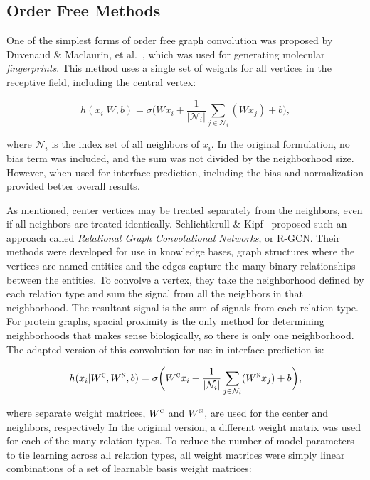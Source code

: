 \subsection{Order Free Methods}
One of the simplest forms of order free graph convolution was proposed by Duvenaud \& Maclaurin, et al.~\cite{duvenaud2015}, which was used for generating molecular \emph{fingerprints}.
This method uses a single set of weights for all vertices in the receptive field, including the central vertex:

\begin{equation}
h(x_i | W, b)= \sigma \bigg( W x_i +  \frac{1}{|\mathcal{N}_i|} \sum_{j \in \mathcal{N}_i} (W x_j) + b\bigg),
\label{eq:fingerprint}
\end{equation}

\noindent
where $\mathcal{N}_i$ is the index set of all neighbors of $x_i$.
In the original formulation, no bias term was included, and the sum was not divided by the neighborhood size.
However, when used for interface prediction, including the bias and normalization provided better overall results.

As mentioned, center vertices may be treated separately from the neighbors, even if all neighbors are treated identically. 
Schlichtkrull \& Kipf~\cite{schlichtkrull2017} proposed such an approach called \emph{Relational Graph Convolutional Networks}, or R-GCN.
Their methods were developed for use in knowledge bases, graph structures where the vertices are named entities and the edges capture the many binary relationships between the entities. 
To convolve a vertex, they take the neighborhood defined by each relation type and sum the signal from all the neighbors in that neighborhood.
The resultant signal is the sum of signals from each relation type.
For protein graphs, spacial proximity is the only method for determining neighborhoods that makes sense biologically, so there is only one neighborhood.
The adapted version of this convolution for use in interface prediction is:

\begin{equation}
h(x_i | W^\textsc{c}, W^\textsc{n}, b)= \sigma \bigg( W^\textsc{c} x_i + \frac{1}{|\mathcal{N}_i|} \sum_{j \in \mathcal{N}_i}(W^\textsc{n} x_j)  + b\bigg),
\label{eq:rgcn}
\end{equation}

\noindent
where separate weight matrices, $W^\textsc{c}$ and $W^\textsc{n}$, are used for the center and neighbors, respectively
In the original version, a different weight matrix was used for each of the many relation types.  
To reduce the number of model parameters to tie learning across all relation types, all weight matrices were simply linear combinations of a set of learnable basis weight matrices:

